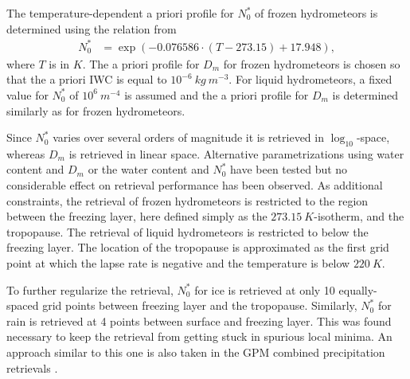 \documentclass[journal abbreviation, manuscript]{copernicus}
\begin{document}
The temperature-dependent a priori profile for $N_0^*$ of frozen
hydrometeors is determined using the relation from \cite{delanoe14}
%
\begin{align}
N_0^* &= \exp \left ( -0.076586 \cdot (T - 273.15) + 17.948 \right ),
\end{align}
%
where $T$ is in $\unit{K}$. The a priori profile for $D_m$ for frozen
hydrometeors is chosen so that the a priori IWC  is equal to
$10^{-6}\ \unit{kg\ m^{-3}}$. For liquid hydrometeors, a fixed value for $N_0^*$
of $10^6\ \unit{m^{-4}}$ is assumed and the a priori profile for $D_m$ is
determined similarly as for frozen hydrometeors.

Since $N_0^*$ varies over several orders of magnitude it is retrieved in
$\log_{10}$-space, whereas $D_m$ is retrieved in linear space. Alternative
parametrizations using water content and $D_m$ or the water content and $N_0^*$
have been tested but no considerable effect on retrieval performance has been
observed. As additional constraints, the retrieval of frozen hydrometeors is
restricted to the region between the freezing layer, here defined simply as the
$273.15\ \unit{K}$-isotherm, and the tropopause. The retrieval of liquid
hydrometeors is restricted to below the freezing layer. The location of the
tropopause is approximated as the first grid point at which the lapse rate is
negative and the temperature is below $220\ \unit{K}$.

To further regularize the retrieval, $N_0^*$ for ice is retrieved at only 10
equally-spaced grid points between freezing layer and the tropopause. Similarly,
$N_0^*$ for rain is retrieved at 4 points between surface and freezing layer.
This was found necessary to keep the retrieval from getting stuck in spurious
local minima. An approach similar to this one is also taken in the GPM combined
precipitation retrievals \citep{grecu16}.
\end{document}
